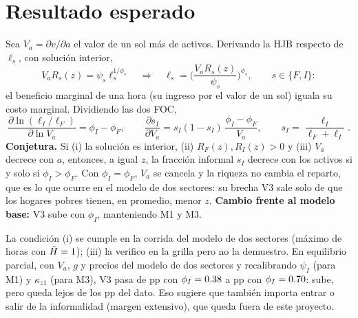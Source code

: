 \documentclass[11pt]{article}
\begin{document}
\section{Resultado esperado}
Sea $V_a=\partial v/\partial a$ el valor de un sol más de activos. Derivando la HJB respecto de $\ell_s$, con solución interior,
\begin{equation}
V_aR_s(z)=\psi_s\ell_s^{1/\phi_s}\quad\Longrightarrow\quad\ell_s=\Big(\frac{V_aR_s(z)}{\psi_s}\Big)^{\phi_s},\qquad s\in\{F,I\}:
\label{eq:foc}
\end{equation}
el beneficio marginal de una hora (su ingreso por el valor de un sol) iguala su costo marginal. Dividiendo las dos FOC,
\begin{equation}
\frac{\partial\ln(\ell_I/\ell_F)}{\partial\ln V_a}=\phi_I-\phi_F,
\qquad
\frac{\partial s_I}{\partial V_a}=s_I(1-s_I)\,\frac{\phi_I-\phi_F}{V_a},
\qquad s_I=\frac{\ell_I}{\ell_F+\ell_I}.
\label{eq:result}
\end{equation}
\textbf{Conjetura.} Si (i) la solución es interior, (ii) $R_F(z),R_I(z)>0$ y (iii) $V_a$ decrece con $a$, entonces, a igual $z$, la fracción
informal $s_I$ decrece con los activos si y solo si $\phi_I>\phi_F$. Con $\phi_I=\phi_F$, $V_a$ se cancela y la riqueza no cambia el reparto,
que es lo que ocurre en el modelo de dos sectores: su brecha V3 sale solo de que los hogares pobres tienen, en promedio, menor $z$.
\textbf{Cambio frente al modelo base:} V3 sube con $\phi_I$, manteniendo M1 y M3.

La condición (i) se cumple en la corrida del modelo de dos sectores (máximo de horas \MaxHoursBase{} con $\bar H=1$); (iii) la verifico en la grilla
pero no la demuestro. En equilibrio parcial, con $V_a$, $g$ y precios del modelo de dos sectores y recalibrando $\psi_I$ (para M1) y $\kappa_{z1}$ (para M3),
V3 pasa de \VThreeThesisBasePP{} pp con $\phi_I=0.38$ a \VThreeThesisHighPP{} pp con $\phi_I=0.70$: sube, pero queda lejos de los \DataVThree{} pp del dato.
Eso sugiere que también importa entrar o salir de la informalidad (margen extensivo), que queda fuera de este proyecto.
\end{document}
